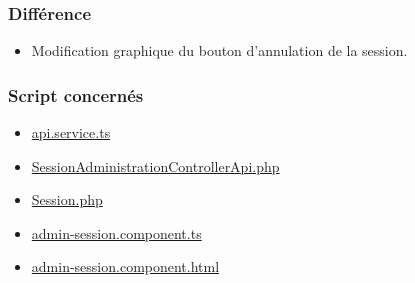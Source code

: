 \subsubsection{Différence}
	\begin{itemize}
		\item Modification graphique du bouton d'annulation de la session. 
	\end{itemize}

\vspace{\baselineskip}
\subsubsection{Script concernés}
	\begin{itemize}
		\item \href{https://github.com/victorsmits/Aquabike/blob/master/frontend/src/app/service/api.service.ts}{api.service.ts}
		\item \href{https://github.com/victorsmits/Aquabike/blob/master/backend/src/Controller/API/SessionAdministrationControllerApi.php}{SessionAdministrationControllerApi.php}
		\item \href{https://github.com/victorsmits/Aquabike/blob/master/backend/src/Entity/Session.php}{Session.php}
		\item \href{https://github.com/victorsmits/Aquabike/blob/master/frontend/src/app/admin-session/admin-session.component.ts}{admin-session.component.ts}
		\item \href{https://github.com/victorsmits/Aquabike/blob/master/frontend/src/app/admin-session/admin-session.component.html}{admin-session.component.html}
	\end{itemize}